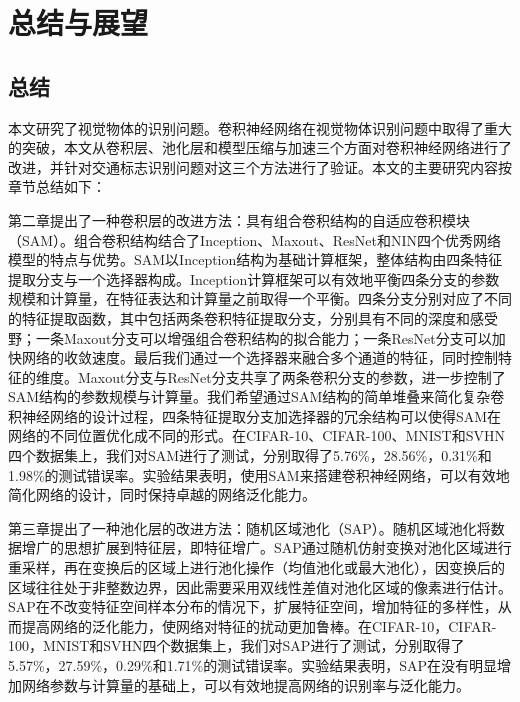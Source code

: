 \chapter{总结与展望}
\label{cha:conclusion}

\section{总结}

本文研究了视觉物体的识别问题。卷积神经网络在视觉物体识别问题中取得了重大的突破，本文从卷积层、池化层和模型压缩与加速三个方面对卷积神经网络进行了改进，并针对交通标志识别问题对这三个方法进行了验证。本文的主要研究内容按章节总结如下：

第二章提出了一种卷积层的改进方法：具有组合卷积结构的自适应卷积模块（SAM）。组合卷积结构结合了Inception、Maxout、ResNet和NIN四个优秀网络模型的特点与优势。SAM以Inception结构为基础计算框架，整体结构由四条特征提取分支与一个选择器构成。Inception计算框架可以有效地平衡四条分支的参数规模和计算量，在特征表达和计算量之前取得一个平衡。四条分支分别对应了不同的特征提取函数，其中包括两条卷积特征提取分支，分别具有不同的深度和感受野；一条Maxout分支可以增强组合卷积结构的拟合能力；一条ResNet分支可以加快网络的收敛速度。最后我们通过一个选择器来融合多个通道的特征，同时控制特征的维度。Maxout分支与ResNet分支共享了两条卷积分支的参数，进一步控制了SAM结构的参数规模与计算量。我们希望通过SAM结构的简单堆叠来简化复杂卷积神经网络的设计过程，四条特征提取分支加选择器的冗余结构可以使得SAM在网络的不同位置优化成不同的形式。在CIFAR-10、CIFAR-100、MNIST和SVHN四个数据集上，我们对SAM进行了测试，分别取得了5.76\%，28.56\%，0.31\%和1.98\%的测试错误率。实验结果表明，使用SAM来搭建卷积神经网络，可以有效地简化网络的设计，同时保持卓越的网络泛化能力。

第三章提出了一种池化层的改进方法：随机区域池化（SAP）。随机区域池化将数据增广的思想扩展到特征层，即特征增广。SAP通过随机仿射变换对池化区域进行重采样，再在变换后的区域上进行池化操作（均值池化或最大池化），因变换后的区域往往处于非整数边界，因此需要采用双线性差值对池化区域的像素进行估计。SAP在不改变特征空间样本分布的情况下，扩展特征空间，增加特征的多样性，从而提高网络的泛化能力，使网络对特征的扰动更加鲁棒。在CIFAR-10，CIFAR-100，MNIST和SVHN四个数据集上，我们对SAP进行了测试，分别取得了5.57\%，27.59\%，0.29\%和1.71\%的测试错误率。实验结果表明，SAP在没有明显增加网络参数与计算量的基础上，可以有效地提高网络的识别率与泛化能力。

